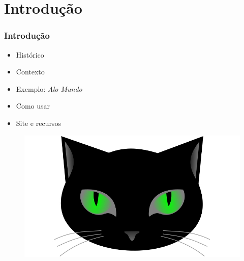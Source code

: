 \section{Introdução}


\begin{frame}
\frametitle{Introdução}
\begin{minipage}{0.47\textwidth}
    \begin{itemize}
        \item Histórico
        \item Contexto
        \item Exemplo: \textit{Alo Mundo}
        \item Como usar
        \item Site e recursos
    \end{itemize}
\end{minipage}
\begin{minipage}{0.5\textwidth}
\begin{figure}[ht!]
\begin{center}
\includegraphics[width=1.2\textwidth, height=0.40\textheight]{figures/logo_picat_alex.jpg}
\end{center}
\end{figure}
\end{minipage}
\end{frame}



